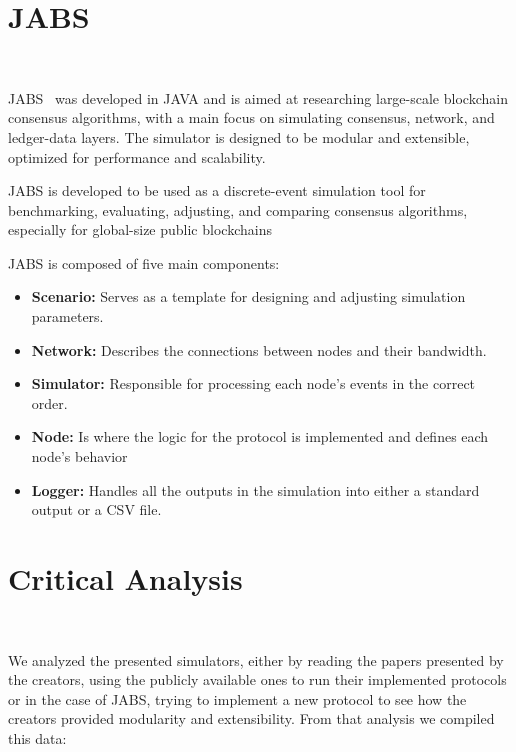 \section{JABS}~\label{subsec:jabs}

JABS~\cite{jabs} was developed in JAVA and is aimed at researching large-scale blockchain consensus algorithms, with a main focus
on simulating consensus, network, and ledger-data layers. The simulator is designed to be
modular and extensible, optimized for performance and scalability.

JABS is developed to be used as a discrete-event simulation tool for benchmarking, evaluating, adjusting,
and comparing consensus algorithms, especially for global-size public blockchains

JABS is composed of five main components:

\begin{itemize}
  \item \textbf{Scenario:} Serves as a template for designing and adjusting simulation parameters.
  \item \textbf{Network:} Describes the connections between nodes and their bandwidth.
  \item \textbf{Simulator:} Responsible for processing each node's events in the correct order.
  \item \textbf{Node:} Is where the logic for the protocol is implemented and defines each node's
  behavior
  \item \textbf{Logger:} Handles all the outputs in the simulation into either a standard output or
  a CSV file.
\end{itemize}


\section{Critical Analysis}~\label{subsec:critical_analysis}

We analyzed the presented simulators, either by reading the papers presented by the creators,
using the publicly available ones to run their implemented protocols or in the case of JABS, trying to
implement a new protocol to see how the creators provided modularity and extensibility. From that
analysis we compiled this data:

